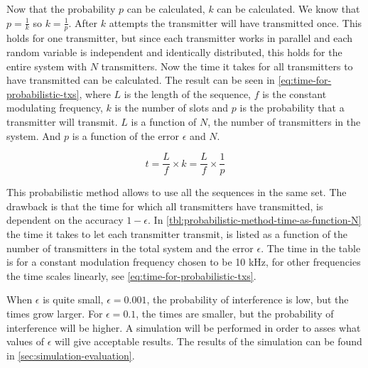 Now that the probability $p$ can be calculated, $k$ can be calculated.
We know that $p = \frac{1}{k}$ so $k = \frac{1}{p}$.
After $k$ attempts the transmitter will have transmitted once.
This holds for one transmitter, but since each transmitter works in parallel and each random variable is independent and identically distributed, this holds for the entire system with $N$ transmitters.
Now the time it takes for all transmitters to have transmitted can be calculated.
The result can be seen in \autoref{eq:time-for-probabilistic-txs}, where $L$ is the length of the sequence, $f$ is the constant modulating frequency, $k$ is the number of slots and $p$ is the probability that a transmitter will transmit.
$L$ is a function of $N$, the number of transmitters in the system.
And $p$ is a function of the error $\epsilon$ and $N$.

\begin{equation}
	\label{eq:time-for-probabilistic-txs}
	t = \frac{L}{f} \times k = \frac{L}{f} \times \frac{1}{p}
\end{equation}

This probabilistic method allows to use all the sequences in the same set.
The drawback is that the time for which all transmitters have transmitted, is dependent on the accuracy $1 - \epsilon$.
In \autoref{tbl:probabilistic-method-time-as-function-N} the time it takes to let each transmitter transmit, is listed as a function of the number of transmitters in the total system and the error $\epsilon$. 
The time in the table is for a constant modulation frequency chosen to be 10 kHz, for other frequencies the time scales linearly, see \autoref{eq:time-for-probabilistic-txs}.






When $\epsilon$ is quite small, $\epsilon = 0.001$, the probability of interference is low, but the times grow larger. 
For $\epsilon = 0.1$, the times are smaller, but the probability of interference will be higher.
A simulation will be performed in order to asses what values of $\epsilon$  will give acceptable results.
The results of the simulation can be found in \autoref{sec:simulation-evaluation}.




